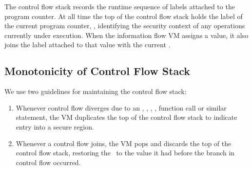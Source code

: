 The control flow stack records the runtime sequence of labels attached to the program counter.
At all time the top of the control flow stack holds the label of the current program counter, \term{\pclabel}, identifying the security context of any operations currently under execution.
When the information flow VM assigns a value, it also joins the label attached to that value with the current \pclabel.

\subsection{Monotonicity of Control Flow Stack}

We use two guidelines for maintaining the control flow stack:
\begin{enumerate}
 \item Whenever control flow diverges due to an , , , , function call or similar statement, the VM duplicates the top of the control flow stack to indicate entry into a secure region.
 \item Whenever a control flow joins, the VM pops and discards the top of the control flow stack, restoring the \pclabel\ to the value it had before the branch in control flow occurred.
\end{enumerate}


